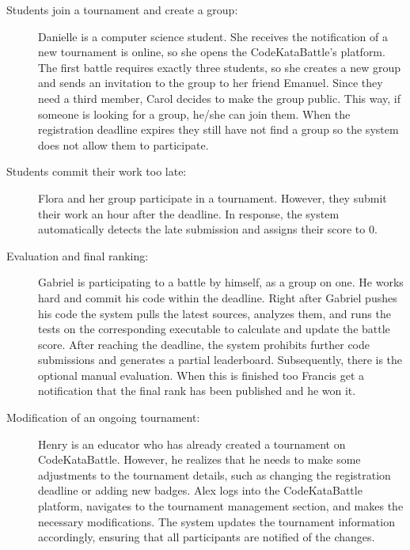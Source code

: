 \documentclass{article}
\begin{document}
\begin{description}
                     \item[Students join a tournament and create a group:]

                     Danielle is a computer science student. She receives the notification of a new tournament is online, so she opens the CodeKataBattle's platform. The first battle requires exactly three students, so she creates a new group and sends an invitation to the group to her friend Emanuel. Since they need a third member, Carol decides to make the group public. This way, if someone is looking for a group, he/she can join them.
                     When the registration deadline expires they still have not find a group so the system does not allow them to participate.
                     

                     \item[Students commit their work too late:]

                    Flora and her group participate in a tournament. However, they submit their work an hour after the deadline. In response, the system automatically detects the late submission and assigns their score to 0.
                    
                     
                     \item[Evaluation and final ranking:]

                     Gabriel is participating to a battle by himself, as a group on one. He works hard and commit his code within the deadline. Right after Gabriel pushes his code the system pulls the latest sources, analyzes them, and runs the tests on the corresponding executable to calculate and update the battle score. After reaching the deadline, the system prohibits further code submissions and generates a partial leaderboard. Subsequently, there is the optional manual evaluation. When this is finished too Francis get a notification that the final rank has been published and he won it.
                     
                    \item[Modification of an ongoing tournament:]

                        Henry is an educator who has already created a tournament on CodeKataBattle. However, he realizes that he needs to make some adjustments to the tournament details, such as changing the registration deadline or adding new badges. Alex logs into the CodeKataBattle platform, navigates to the tournament management section, and makes the necessary modifications. The system updates the tournament information accordingly, ensuring that all participants are notified of the changes.
                        

\end{description}
\end{document}
